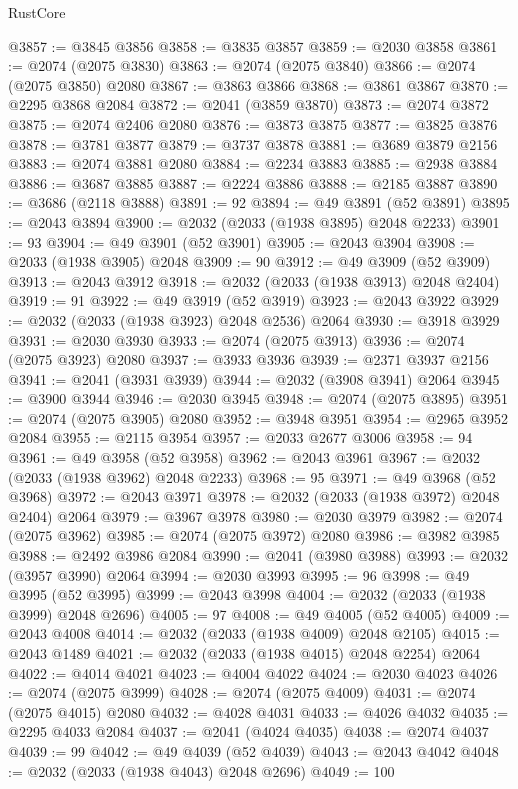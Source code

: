 \begin{lexlean}{RustCore}
\begin{coremodule}
@3857 := @3845 @3856
@3858 := @3835 @3857
@3859 := @2030 @3858
@3861 := @2074 (@2075 @3830)
@3863 := @2074 (@2075 @3840)
@3866 := @2074 (@2075 @3850) @2080
@3867 := @3863 @3866
@3868 := @3861 @3867
@3870 := @2295 @3868 @2084
@3872 := @2041 (@3859 @3870)
@3873 := @2074 @3872
@3875 := @2074 @2406 @2080
@3876 := @3873 @3875
@3877 := @3825 @3876
@3878 := @3781 @3877
@3879 := @3737 @3878
@3881 := @3689 @3879 @2156
@3883 := @2074 @3881 @2080
@3884 := @2234 @3883
@3885 := @2938 @3884
@3886 := @3687 @3885
@3887 := @2224 @3886
@3888 := @2185 @3887
@3890 := @3686 (@2118 @3888)
@3891 := 92
@3894 := @49 @3891 (@52 @3891)
@3895 := @2043 @3894
@3900 := @2032 (@2033 (@1938 @3895) @2048 @2233)
@3901 := 93
@3904 := @49 @3901 (@52 @3901)
@3905 := @2043 @3904
@3908 := @2033 (@1938 @3905) @2048
@3909 := 90
@3912 := @49 @3909 (@52 @3909)
@3913 := @2043 @3912
@3918 := @2032 (@2033 (@1938 @3913) @2048 @2404)
@3919 := 91
@3922 := @49 @3919 (@52 @3919)
@3923 := @2043 @3922
@3929 := @2032 (@2033 (@1938 @3923) @2048 @2536) @2064
@3930 := @3918 @3929
@3931 := @2030 @3930
@3933 := @2074 (@2075 @3913)
@3936 := @2074 (@2075 @3923) @2080
@3937 := @3933 @3936
@3939 := @2371 @3937 @2156
@3941 := @2041 (@3931 @3939)
@3944 := @2032 (@3908 @3941) @2064
@3945 := @3900 @3944
@3946 := @2030 @3945
@3948 := @2074 (@2075 @3895)
@3951 := @2074 (@2075 @3905) @2080
@3952 := @3948 @3951
@3954 := @2965 @3952 @2084
@3955 := @2115 @3954
@3957 := @2033 @2677 @3006
@3958 := 94
@3961 := @49 @3958 (@52 @3958)
@3962 := @2043 @3961
@3967 := @2032 (@2033 (@1938 @3962) @2048 @2233)
@3968 := 95
@3971 := @49 @3968 (@52 @3968)
@3972 := @2043 @3971
@3978 := @2032 (@2033 (@1938 @3972) @2048 @2404) @2064
@3979 := @3967 @3978
@3980 := @2030 @3979
@3982 := @2074 (@2075 @3962)
@3985 := @2074 (@2075 @3972) @2080
@3986 := @3982 @3985
@3988 := @2492 @3986 @2084
@3990 := @2041 (@3980 @3988)
@3993 := @2032 (@3957 @3990) @2064
@3994 := @2030 @3993
@3995 := 96
@3998 := @49 @3995 (@52 @3995)
@3999 := @2043 @3998
@4004 := @2032 (@2033 (@1938 @3999) @2048 @2696)
@4005 := 97
@4008 := @49 @4005 (@52 @4005)
@4009 := @2043 @4008
@4014 := @2032 (@2033 (@1938 @4009) @2048 @2105)
@4015 := @2043 @1489
@4021 := @2032 (@2033 (@1938 @4015) @2048 @2254) @2064
@4022 := @4014 @4021
@4023 := @4004 @4022
@4024 := @2030 @4023
@4026 := @2074 (@2075 @3999)
@4028 := @2074 (@2075 @4009)
@4031 := @2074 (@2075 @4015) @2080
@4032 := @4028 @4031
@4033 := @4026 @4032
@4035 := @2295 @4033 @2084
@4037 := @2041 (@4024 @4035)
@4038 := @2074 @4037
@4039 := 99
@4042 := @49 @4039 (@52 @4039)
@4043 := @2043 @4042
@4048 := @2032 (@2033 (@1938 @4043) @2048 @2696)
@4049 := 100

\end{coremodule}
\end{lexlean}
